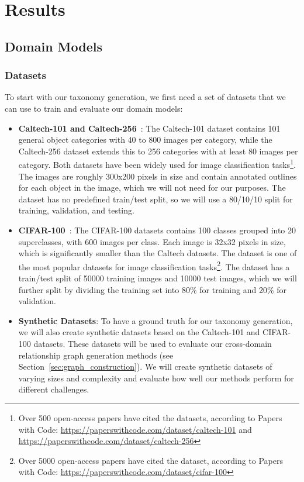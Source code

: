 \chapter{Results}

\section{Domain Models}

\subsection{Datasets}

To start with our taxonomy generation,
we first need a set of datasets that we can use to train and evaluate our domain models:

\begin{itemize}
      \item \textbf{Caltech-101 and Caltech-256}~\cite{li_caltech_2022,griffin_caltech_2022}:
            The Caltech-101 dataset contains 101 general object categories with 40 to 800 images per category,
            while the Caltech-256 dataset extends this to 256 categories with at least 80 images per category.
            Both datasets have been widely used for image classification tasks\footnote{Over 500 open-access papers have cited the datasets, according to Papers with Code: \url{https://paperswithcode.com/dataset/caltech-101} and \url{https://paperswithcode.com/dataset/caltech-256}}.
            The images are roughly 300x200 pixels in size and contain annotated outlines
            for each object in the image, which we will not need for our purposes.
            The dataset has no predefined train/test split,
            so we will use a 80/10/10 split for training, validation, and testing.
      \item \textbf{CIFAR-100}~\cite{krizhevsky_learning_2009}:
            The CIFAR-100 datasets contains 100 classes grouped into 20 superclasses,
            with 600 images per class.
            Each image is 32x32 pixels in size, which is significantly smaller than the Caltech datasets.
            The dataset is one of the most popular datasets for image classification tasks\footnote{Over 5000 open-access papers have cited the dataset, according to Papers with Code: \url{https://paperswithcode.com/dataset/cifar-100}}.
            The dataset has a train/test split of 50000 training images and 10000 test images,
            which we will further split by dividing the training set into 80\% for training and 20\% for validation.
      \item \textbf{Synthetic Datasets}:
            To have a ground truth for our taxonomy generation,
            we will also create synthetic datasets based on the Caltech-101 and CIFAR-100 datasets.
            These datasets will be used to evaluate our cross-domain relationship graph generation
            methods (see Section~\ref{sec:graph_construction}).
            We will create synthetic datasets of varying sizes and complexity and evaluate
            how well our methods perform for different challenges.
\end{itemize}

